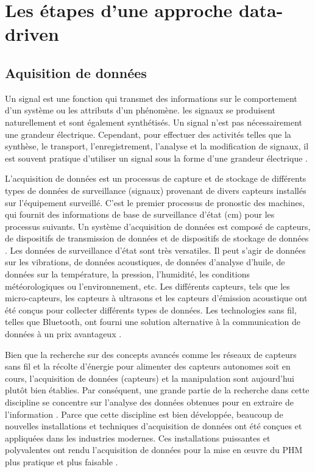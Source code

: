 \chapter{Les étapes d'une approche data-driven}

\section{Aquisition de données}
\label{sec:data-acquisition}
Un signal est une fonction qui transmet des informations sur le comportement d'un système ou les attributs d'un phénomène. les signaux se produisent naturellement et sont également synthétisés. Un signal n'est pas nécessairement une grandeur électrique. Cependant, pour effectuer des activités telles que la synthèse, le transport, l'enregistrement, l'analyse et la modification de signaux, il est souvent pratique d'utiliser un signal sous la forme d'une grandeur électrique \cite{Priemer1990}.

L'acquisition de données est un processus de capture et de stockage de différents types de données de surveillance (signaux) provenant de divers capteurs installés sur l'équipement surveillé. C'est le premier processus de pronostic des machines, qui fournit des informations de base de surveillance d'état (\acrlong{cm}) pour les processus suivants. Un système d'acquisition de données est composé de capteurs, de dispositifs de transmission de données et de dispositifs de stockage de données \cite{Lei2018}. Les données de surveillance d'état sont très versatiles. Il peut s'agir de données sur les vibrations, de données acoustiques, de données d'analyse d'huile, de données sur la température, la pression, l'humidité, les conditions météorologiques ou l'environnement, etc. Les différents capteurs, tels que les micro-capteurs, les capteurs à ultrasons et les capteurs d'émission acoustique ont été conçus pour collecter différents types de données. Les technologies sans fil, telles que Bluetooth, ont fourni une solution alternative à la communication de données à un prix avantageux \cite{Jardine2006}.

Bien que la recherche sur des concepts avancés comme les réseaux de capteurs sans fil et la récolte d’énergie pour alimenter des capteurs autonomes soit en cours, l’acquisition de données (capteurs) et la manipulation sont aujourd’hui plutôt bien établies. Par conséquent, une grande partie de la recherche dans cette discipline se concentre sur l’analyse des données obtenues pour en extraire de l’information \cite{Tinga2014}. Parce que cette discipline est bien développée, beaucoup de nouvelles installations et techniques d’acquisition de données ont été conçues et appliquées dans les industries modernes. Ces installations puissantes et polyvalentes ont rendu l’acquisition de données pour la mise en œuvre du PHM plus pratique et plus faisable \cite{Lei2016}.

